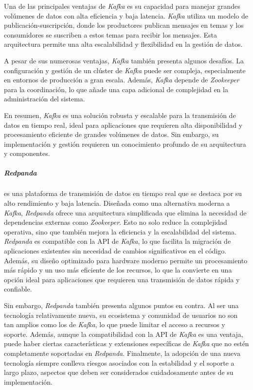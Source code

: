 Una de las principales ventajas de \textit{Kafka} es su capacidad para manejar
grandes volúmenes de datos con alta eficiencia y baja latencia. \textit{Kafka}
utiliza un modelo de publicación-suscripción, donde los productores publican
mensajes en temas y los consumidores se suscriben a estos temas para recibir
los mensajes. Esta arquitectura permite una alta escalabilidad y flexibilidad
en la gestión de datos.

A pesar de sus numerosas ventajas, \textit{Kafka} también presenta algunos
desafíos. La configuración y gestión de un clúster de \textit{Kafka} puede ser
compleja, especialmente en entornos de producción a gran escala. Además,
\textit{Kafka} depende de \textit{Zookeeper} para la coordinación, lo que añade
una capa adicional de complejidad en la administración del sistema.

En resumen, \textit{Kafka} es una solución robusta y escalable para la
transmisión de datos en tiempo real, ideal para aplicaciones que requieren alta
disponibilidad y procesamiento eficiente de grandes volúmenes de datos. Sin
embargo, su implementación y gestión requieren un conocimiento profundo de su
arquitectura y componentes.

\subparagraph{Redpanda} es una plataforma de transmisión de datos en tiempo real
que se destaca por su alto rendimiento y baja latencia. Diseñada como una
alternativa moderna a \textit{Kafka}, \textit{Redpanda} ofrece una arquitectura
simplificada que elimina la necesidad de dependencias externas como
\textit{Zookeeper}. Esto no solo reduce la complejidad operativa, sino que
también mejora la eficiencia y la escalabilidad del sistema. \textit{Redpanda}
es compatible con la API de \textit{Kafka}, lo que facilita la migración de
aplicaciones existentes sin necesidad de cambios significativos en el código.
Además, su diseño optimizado para hardware moderno permite un procesamiento más
rápido y un uso más eficiente de los recursos, lo que la convierte en una opción
ideal para aplicaciones que requieren una transmisión de datos rápida y
confiable.

Sin embargo, \textit{Redpanda} también presenta algunos puntos en contra. Al ser
una tecnología relativamente nueva, su ecosistema y comunidad de usuarios no son
tan amplios como los de \textit{Kafka}, lo que puede limitar el acceso a
recursos y soporte. Además, aunque la compatibilidad con la API de
\textit{Kafka} es una ventaja, puede haber ciertas características y extensiones
específicas de \textit{Kafka} que no estén completamente soportadas en
\textit{Redpanda}. Finalmente, la adopción de una nueva tecnología siempre
conlleva riesgos asociados con la estabilidad y el soporte a largo plazo,
aspectos que deben ser considerados cuidadosamente antes de su implementación.

